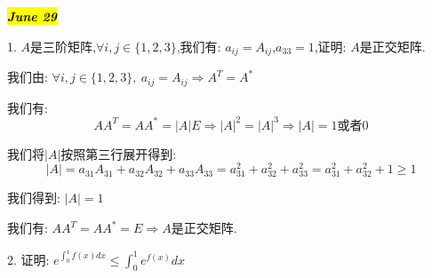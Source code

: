 \hl{\textbf{\textit{June 29}}}

1. $A$是三阶矩阵,$\forall i,j\in\{1,2,3\}$,我们有: $a_{ij}=A_{ij}$,$a_{33}=1$,证明: $A$是正交矩阵.
\begin{solution}
	
	我们由: $\forall i,j\in\{1,2,3\},\ a_{ij}=A_{ij}\Rightarrow A^{T}=A^{*}$
	
	我们有: $$AA^{T}=AA^{*}=|A|E\Rightarrow |A|^2=|A|^3\Rightarrow |A|=1\text{或者}0$$
	
	我们将$|A|$按照第三行展开得到: $$|A|=a_{31}A_{31}+a_{32}A_{32}+a_{33}A_{33}=a_{31}^2+a_{32}^2+a_{33}^2=a_{31}^2+a_{32}^2+1\geq 1$$
	
	我们得到: $|A|=1$
	
	我们有: $AA^{T}=AA^{*}=E\Rightarrow A\text{是正交矩阵}$.
\end{solution}

2. 证明: $e^{\int_{0}^{1}f(x)dx}\leq \int_{0}^{1}e^{f(x)}dx$

